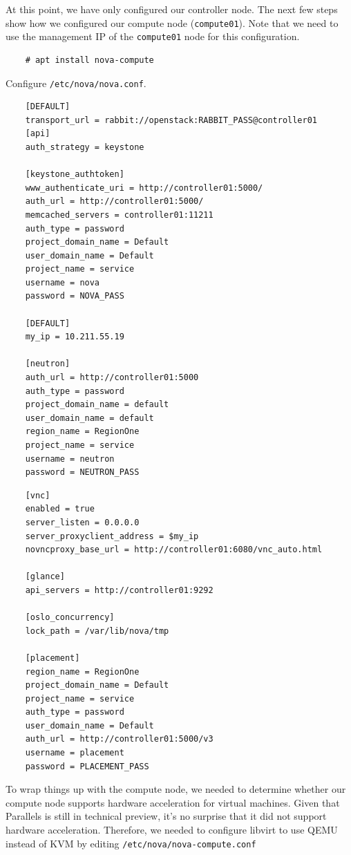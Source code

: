\documentclass{article}
\begin{document}
At this point, we have only configured our controller node. The next few steps show how we configured our compute node (\texttt{compute01}). Note that we need to use the management IP of the \texttt{compute01} node for this configuration.

\begin{verbatim}
    # apt install nova-compute
\end{verbatim}
Configure \texttt{/etc/nova/nova.conf}.

\begin{verbatim}
    [DEFAULT]
    transport_url = rabbit://openstack:RABBIT_PASS@controller01
    [api]
    auth_strategy = keystone

    [keystone_authtoken]
    www_authenticate_uri = http://controller01:5000/
    auth_url = http://controller01:5000/
    memcached_servers = controller01:11211
    auth_type = password
    project_domain_name = Default
    user_domain_name = Default
    project_name = service
    username = nova
    password = NOVA_PASS

    [DEFAULT]
    my_ip = 10.211.55.19

    [neutron]
    auth_url = http://controller01:5000
    auth_type = password
    project_domain_name = default
    user_domain_name = default
    region_name = RegionOne
    project_name = service
    username = neutron
    password = NEUTRON_PASS
\end{verbatim}

\begin{verbatim}
    [vnc]
    enabled = true
    server_listen = 0.0.0.0
    server_proxyclient_address = $my_ip
    novncproxy_base_url = http://controller01:6080/vnc_auto.html

    [glance]
    api_servers = http://controller01:9292

    [oslo_concurrency]
    lock_path = /var/lib/nova/tmp

    [placement]
    region_name = RegionOne
    project_domain_name = Default
    project_name = service
    auth_type = password
    user_domain_name = Default
    auth_url = http://controller01:5000/v3
    username = placement
    password = PLACEMENT_PASS
\end{verbatim}

To wrap things up with the compute node, we needed to determine whether our compute node supports hardware acceleration for virtual machines. Given that Parallels is still in technical preview, it's no surprise that it did not support hardware acceleration. Therefore, we needed to configure libvirt to use QEMU instead of KVM by editing \texttt{/etc/nova/nova-compute.conf}
\end{document}
